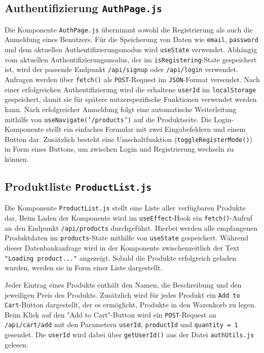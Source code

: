 \documentclass[oneside]{ausarbeitung}
\begin{document}
\subsection{Authentifizierung \texttt{AuthPage.js}} 

Die Komponente \texttt{AuthPage.js} übernimmt sowohl die Registrierung als auch die Anmeldung eines Benutzers.
Für die Speicherung von Daten wie \texttt{email}, \texttt{password} und dem aktuellen Authentifizierungsmodus wird \texttt{useState} verwendet. Abhängig vom aktuellen Authentifizierungsmodus, der im \texttt{isRegistering}-State gespeichert ist, wird der passende Endpunkt \texttt{/api/signup} oder \texttt{/api/login} verwendet.
Anfragen werden über \texttt{fetch()} als \texttt{POST}-Request im \texttt{JSON}-Format versendet.
Nach einer erfolgreichen Authentifizierung wird die erhaltene \texttt{userId} im \texttt{localStorage} gespeichert, damit sie für spätere nutzerspezifische Funktionen verwendet werden kann. Nach erfolgreicher Anmeldung folgt eine automatische Weiterleitung mithilfe von \texttt{useNavigate('/products')} auf die Produktseite.
Die Login-Komponente stellt ein einfaches Formular mit zwei Eingabefeldern und einem Button dar. Zusätzlich besteht eine Umschaltfunktion (\texttt{toggleRegisterMode()}) in Form eines Buttons, um zwischen Login und Registrierung wechseln zu können.

\subsection{Produktliste \texttt{ProductList.js}} 

Die Komponente \texttt{ProductList.js} stellt eine Liste aller verfügbaren Produkte dar. Beim Laden der Komponente wird im \texttt{useEffect}-Hook ein \texttt{fetch()}-Aufruf an den Endpunkt \texttt{/api/products} durchgeführt. Hierbei werden alle empfangenen Produktdaten im \texttt{products}-State mithilfe von \texttt{useState} gespeichert. Während dieser Datenbankanfrage wird in der Komponente zwischenzeitlich der Text \texttt{"Loading product..."} angezeigt. Sobald die Produkte erfolgreich geladen wurden, werden sie in Form einer Liste dargestellt.

Jeder Eintrag eines Produkts enthält den Namen, die Beschreibung und den jeweiligen Preis des Produkts. Zusätzlich wird für jedes Produkt ein \texttt{Add to Cart}-Button dargestellt, der es ermöglicht, Produkte in den Warenkorb zu legen. Beim Klick auf den "Add to Cart"-Button wird ein \texttt{POST}-Request an \texttt{/api/cart/add} mit den Parametern \texttt{userId}, \texttt{productId} und \texttt{quantity = 1} gesendet. Die \texttt{userId} wird dabei über \texttt{getUserId()} aus der Datei \texttt{authUtils.js} gelesen.
\end{document}
